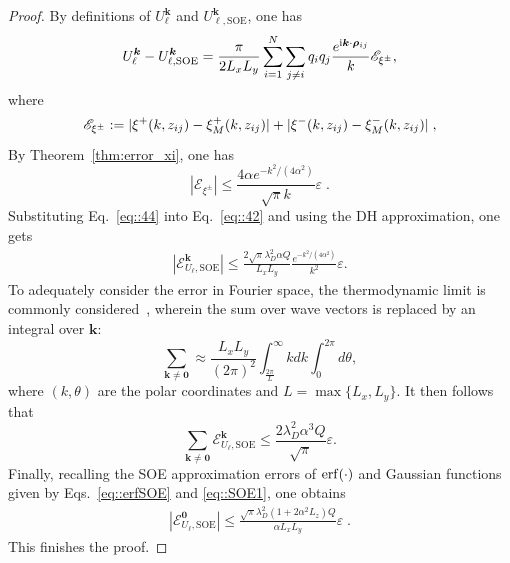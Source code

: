 \begin{proof}
	By definitions of $U_{\ell}^{\bm{k}}$ and $U_{\ell,\text{SOE}}^{\bm{k}}$, one has
	\begin{equation}\label{eq::42}
		U_{\ell}^{\bm{k}}-U_{\ell,\text{SOE}}^{\bm{k}}= \frac{\pi}{2 L_xL_y}\sum_{i=1}^{N}\sum_{j\neq i}q_{i}q_{j}\frac{e^{\mathrm{i} \bm{k}\cdot\bm{\rho}_{ij}}}{k}\mathscr{E}_{\xi^{\pm}},
	\end{equation}
	where 
	\begin{equation}\label{eq::44}
		\mathscr{E}_{\xi^{\pm}} := \lvert\xi^{+}(k,z_{ij})-\xi_{M}^{+}(k,z_{ij})\rvert + \lvert\xi^{-}(k,z_{ij})-\xi_{M}^{-}(k,z_{ij})\rvert\;,
	\end{equation}
	By Theorem~\ref{thm:error_xi}, one has
	\begin{equation}
		|\mathscr{E}_{\xi^{\pm}}|\leq\frac{4\alpha e^{-k^2/(4\alpha^2)}}{\sqrt{\pi}k}\varepsilon\;.
	\end{equation}
	Substituting Eq.~\eqref{eq::44} into Eq.~\eqref{eq::42} and using the DH approximation, one gets
	\begin{equation}\label{eq::47}
		\begin{split}   
			\left| \mathscr{E}_{U_{\ell},\text{SOE}}^{\bm{k}} \right| \leq \frac{2\sqrt{\pi} \lambda_D^2 \alpha Q}{L_x L_y} \frac{e^{-k^2 / (4\alpha^2)}}{k^2} \varepsilon.
		\end{split}
	\end{equation}
	To adequately consider the error in Fourier space, the thermodynamic limit is commonly considered~\cite{kolafa1992cutoff,deserno1998mesh}, wherein the sum over wave vectors is replaced by an integral over $\bm{k}$:
	\begin{equation}\label{eq::integral2}
		\sum_{\bm{k}\neq\bm{0}}\approx \frac{L_xL_y}{(2\pi)^2}\int_{\frac{2\pi}{L}}^{\infty}kdk\int_{0}^{2\pi}d\theta,
	\end{equation}
	where $(k,\theta)$ are the polar coordinates and $L=\max\{L_x,L_y\}$. It then follows that
	\begin{equation}
		\sum_{\bm{k}\neq\bm{0}}\mathscr{E}_{U_{\ell},\text{SOE}}^{ \bm{k}}\leq \frac{2\lambda_D^2\alpha^3Q}{\sqrt{\pi}}\varepsilon.
	\end{equation}
	Finally, recalling the SOE approximation errors of $\operatorname{erf}(\cdot)$ and Gaussian functions given by Eqs.~\eqref{eq::erfSOE} and \eqref{eq::SOE1}, one obtains 
	\begin{equation}
		\begin{split}  
			\left|\mathscr{E}_{U_{\ell},\text{SOE}}^{\bm{0}}\right|\leq \frac{\sqrt{\pi} \lambda_D^2 (1+2\alpha^2L_z)Q}{\alpha L_xL_y}\varepsilon\;.
		\end{split}
	\end{equation}
	This finishes the proof.
	
\end{proof}

